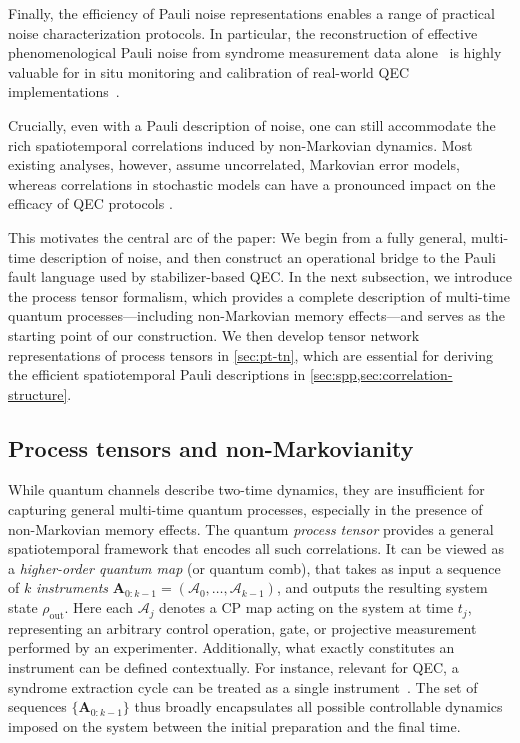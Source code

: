 \documentclass[
    aps,
    prx,
    reprint,
    superscriptaddress,
    longbibliography,
    nofootinbib,
    floatfix,
]{revtex4-2}
\begin{document}
Finally, the efficiency of Pauli noise representations enables a range of practical noise characterization protocols. In particular, the reconstruction of effective phenomenological Pauli noise from syndrome measurement data alone~\cite{wagnerOptimalNoiseEstimation2021,wagnerPauliChannelsCan2022,gicevQuantumComputerError2024,remmExperimentallyInformedDecoding2025} is highly valuable for in situ monitoring and calibration of real-world QEC implementations~\cite{kunjummenSituCalibrationUnitary2025}.

Crucially, even with a Pauli description of noise, one can still accommodate the rich spatiotemporal correlations induced by non-Markovian dynamics. Most existing analyses, however, assume uncorrelated, Markovian error models, whereas correlations in stochastic models can have a pronounced impact on the efficacy of QEC protocols \cite{fowlerQuantifyingEffectsLocal2014,fkamDetrimentalNonMarkovianErrors2025}. 

This motivates the central arc of the paper: We begin from a fully general, multi-time description of noise, and then construct an operational bridge to the Pauli fault language used by stabilizer-based QEC. In the next subsection, we introduce the process tensor formalism, which provides a complete description of multi-time quantum processes---including non-Markovian memory effects---and serves as the starting point of our construction. We then develop tensor network representations of process tensors in \cref{sec:pt-tn}, which are essential for deriving the efficient spatiotemporal Pauli descriptions in \cref{sec:spp,sec:correlation-structure}.

\subsection{Process tensors and non-Markovianity}\label{sec:process_tensors}
While quantum channels describe two-time dynamics, they are insufficient for capturing general multi-time quantum processes, especially in the presence of non-Markovian memory effects. The quantum \emph{process tensor} provides a general spatiotemporal framework that encodes all such correlations. It can be viewed as a \emph{higher-order quantum map} (or quantum comb), that takes as input a sequence of \(k\) \emph{instruments} \(\mathbf{A}_{0:k-1}=(\mathcal{A}_0,\dots,\mathcal{A}_{k-1})\), and outputs the resulting system state \(\rho_\mathrm{out}\). Here each \(\mathcal{A}_j\) denotes a CP map acting on the system at time \(t_j\), representing an arbitrary control operation, gate, or projective measurement performed by an experimenter. Additionally, what exactly constitutes an instrument can be defined contextually. For instance, relevant for QEC, a syndrome extraction cycle can be treated as a single instrument~\cite{tanggaraStrategicCodeUnified2024,kobayashiTensornetworkDecodersProcess2024}. The set of sequences \(\{\mathbf{A}_{0:k-1}\}\) thus broadly encapsulates all possible controllable dynamics imposed on the system between the initial preparation and the final time.
\end{document}
